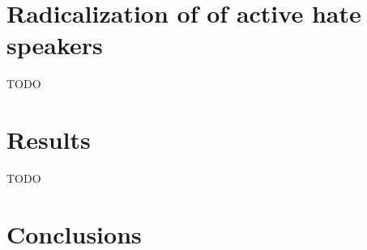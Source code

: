 \documentclass[conference]{IEEEtran}
\begin{document}
\section{Radicalization of of active hate speakers}
TODO



\section{Results}
TODO
\section{Conclusions}








\end{document}
